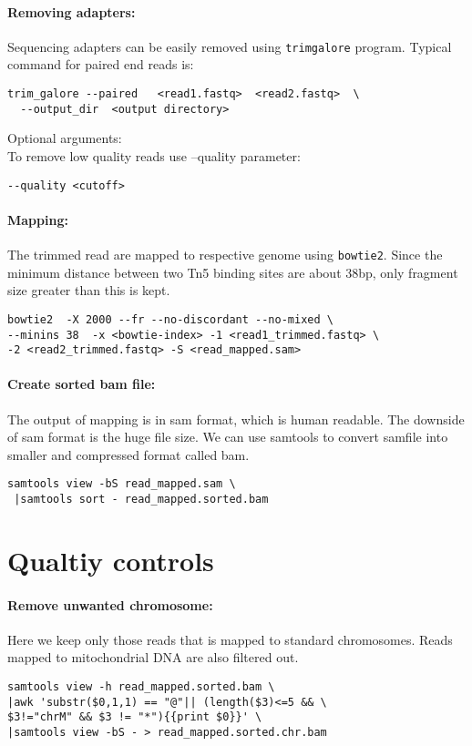 \documentclass[10pt]{article}
\newcommand{\prog}[1]{\texttt{#1}}
\begin{document}
\paragraph{Removing adapters:} Sequencing adapters can be easily removed using  \prog{trimgalore} program. Typical command for paired end reads is:\\
\begin{verbatim}
trim_galore --paired   <read1.fastq>  <read2.fastq>  \
  --output_dir  <output directory>
\end{verbatim}
Optional arguments:\\
To remove low quality reads use --quality parameter:
\begin{verbatim}
--quality <cutoff>
\end{verbatim}
\paragraph{Mapping:}
The trimmed read are mapped to respective genome using \prog{bowtie2}. Since the minimum distance between two Tn5 binding sites are about 38bp, only fragment size greater than this is kept.
\begin{verbatim}
bowtie2  -X 2000 --fr --no-discordant --no-mixed \
--minins 38  -x <bowtie-index> -1 <read1_trimmed.fastq> \
-2 <read2_trimmed.fastq> -S <read_mapped.sam>
\end{verbatim}
\paragraph{Create sorted bam file:} The output of mapping is in sam format, which is human readable. The downside of sam format is the huge file size. We can use samtools to convert samfile into smaller and compressed format called bam.
\begin{verbatim}
samtools view -bS read_mapped.sam \
 |samtools sort - read_mapped.sorted.bam
\end{verbatim}
\section{Qualtiy controls}
\paragraph{Remove unwanted chromosome:} Here we keep only those reads that is mapped to standard chromosomes. Reads mapped to mitochondrial DNA are also filtered out.
\begin{verbatim}
samtools view -h read_mapped.sorted.bam \
|awk 'substr($0,1,1) == "@"|| (length($3)<=5 && \
$3!="chrM" && $3 != "*"){{print $0}}' \
|samtools view -bS - > read_mapped.sorted.chr.bam
\end{verbatim}
\end{document}
